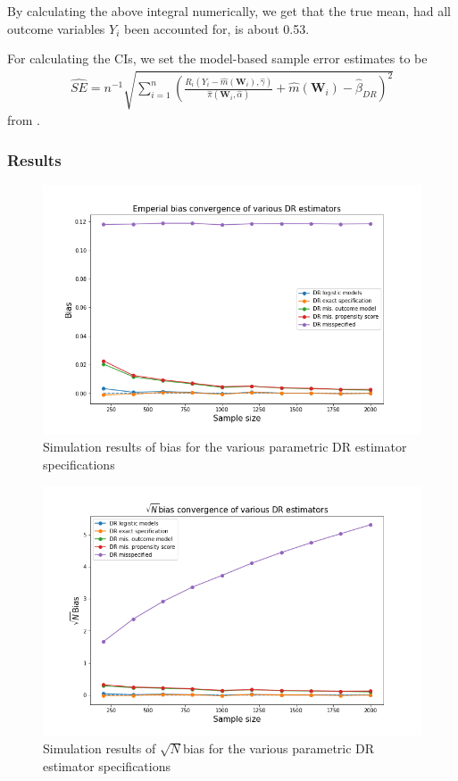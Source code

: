 \documentclass[12pt,twoside]{article}
\begin{document}
By calculating the above integral numerically, we get that the true mean, had all outcome variables $Y_i$ been accounted for, is about 0.53.

For calculating the CIs, we set the model-based sample error estimates to be 
\begin{align*}
    \hat{SE} = n^{-1} \sqrt{\sum_{i=1}^n \left(\frac{R_i(Y_i - \hat m(\mathbf{W}_i), \hat \gamma)}{\hat\pi(\mathbf{W}_i,\hat\alpha)} + \hat m(\mathbf{W}_i) - \hat{\beta}_{DR}\right)^2}
\end{align*}
from \citet{lunceford_davidian}. \\

\subsubsection*{Results}

\begin{figure}[h!]
    \centering
    \includegraphics[width = 0.9\columnwidth]{figures/biaspara.png}
    \caption{Simulation results of bias for the various parametric DR estimator specifications}
    \label{figbiaspara}
\end{figure}

\begin{figure}[h!]
    \centering
    \includegraphics[width = 0.9\columnwidth]{figures/sqrtnpara.png}
    \caption{Simulation results of $\sqrt{N}$bias for the various parametric DR estimator specifications}
    \label{figsqrtnpara}
\end{figure}
\end{document}
